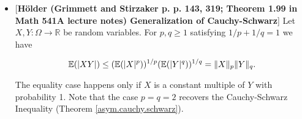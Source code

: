 \begin{itemize}
\begin{itemize}
\begin{proof}Note that from Theorem \ref{cvx.convex.tangent.line}, for any \(y \in \mathbb{R}\) there exists a constant \(a\) and a function \(L\) such that

\[
a(x-y)+\phi(y) \leq \phi(x) \ \ \ \forall x \in \mathbb{R}
\]

Letting \(y = \E(X)\) we have

\[
a (X-\E X)+\phi(\E X) \leq \phi(X)
\]

Since expectations preserve inequalities,

\[
\E[a (X-\E X)+\phi(\E X)] \leq \E \phi(X)
\]

But

\[
\E[a(X-\E X)+\phi(\E X)]  = a(\E X - \E X) + \E(\phi(\E X)) = \phi(\E X)
\]

which yields

\[
\phi( \E X) \leq \E \phi(X).
\]

\end{proof}

%
%
%
%
%
%
%
%
%
%
%

For some corollaries, see section \ref{cvx.sec.jensen.etc}.


\item \begin{theorem}\label{asym.thm.holder.ineq}[\textbf{H\"{o}lder (Grimmett and Stirzaker p. p. 143, 319; Theorem 1.99 in Math 541A lecture notes) Generalization of Cauchy-Schwarz}] Let \(X, Y : \Omega \to \mathbb{R}\) be random variables. For \(p, q \geq 1\) satisfying \(1/p + 1/q =1\) we have

\[
\mathbb{E}(|XY|) \leq (\mathbb{E}(|X|^p))^{1/p}(\mathbb{E}(|Y|^q))^{1/q} = \lVert X \rVert_p \lVert Y \rVert_q.
\]

The equality case happens only if \(X\) is a constant multiple of \(Y\) with probability 1. Note that the case \(p=q=2\) recovers the Cauchy-Schwarz Inequality (Theorem \ref{asym.cauchy.schwarz}).
\end{theorem}


\end{itemize}
\end{itemize}
